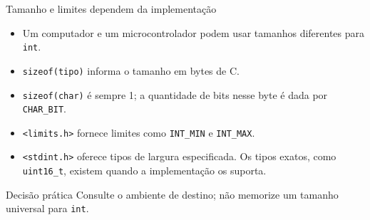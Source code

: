 \begin{frame}{Tamanho e limites dependem da implementação}
\begin{itemize}
\item Um computador e um microcontrolador podem usar tamanhos diferentes para \texttt{int}.
\item \texttt{sizeof(tipo)} informa o tamanho em bytes de C.
\item \texttt{sizeof(char)} é sempre 1; a quantidade de bits nesse byte é dada por \texttt{CHAR\_BIT}.
\item \texttt{<limits.h>} fornece limites como \texttt{INT\_MIN} e \texttt{INT\_MAX}.
\item \texttt{<stdint.h>} oferece tipos de largura especificada. Os tipos exatos, como \texttt{uint16\_t}, existem quando a implementação os suporta.
\end{itemize}
\begin{block}{Decisão prática}
Consulte o ambiente de destino; não memorize um tamanho universal para \texttt{int}.
\end{block}
\end{frame}
